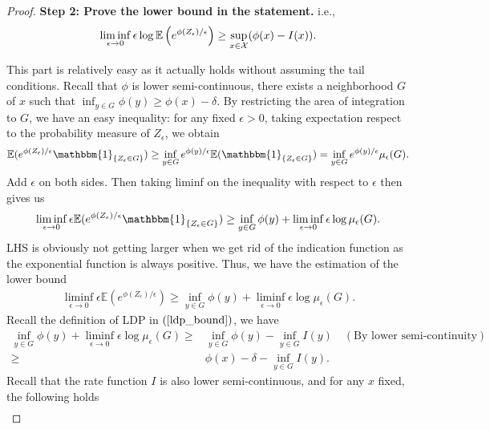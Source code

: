 \documentclass[10pt]{article}
\def\X{{\cal X}}
\newcommand{\e}{\mathbb{E}}
\newenvironment{Proof of lemma}{\noindent{\bf Proof of Lemma}}{\hfill$\Box$\newline}
\newenvironment{Proof of claim}{\noindent{\bf Proof of claim}}{\hfill$\Box$\newline}
\newenvironment{Proof of theorem}{\noindent{\bf Proof of Theorem}}{\hfill\scriptsize{$\Box$}\newline}
\newenvironment{Proof of theorems}{\noindent{\bf Proof of Theorems}}{\hfill$\Box$\newline}
\newenvironment{Proof of proposition}{\noindent{\bf Proof of Proposition}}{\hfill$\Box$\newline}
\newenvironment{Proof of propositions}{\noindent{\bf Proof of Propositions}}{\hfill$\Box$\newline}
\newenvironment{Proof of exercise}{\noindent{\it Proof of Exercise:}}{\hfill$\Box$}
\numberwithin{equation}{section}
\begin{document}
\begin{proof}
    \textbf{Step 2: Prove the lower bound in the statement.} i.e.,
    \begin{align}
        \liminf_{\epsilon \to 0} \epsilon \log \e \left(e^{\phi(Z_{\epsilon})/\epsilon}\right) \geq \sup_{x \in \X}(\phi(x)-I(x)).
    \end{align}

    This part is relatively easy as it actually holds without assuming the tail conditions. Recall that $\phi$ is lower semi-continuous, there exists a neighborhood $G$ of $x$ such that $\inf_{y \in G} \phi(y) \geq \phi(x) - \delta$. By restricting the area of integration to $G$, we have an easy inequality: for any fixed $\epsilon > 0$, taking expectation respect to the probability measure of $Z_{\epsilon}$, we obtain
    \begin{align}
        \e(e^{\phi(Z_{\epsilon})/\epsilon}\mathbbm{1}_{\{Z_{\epsilon}\in G\}}) \geq \inf_{y \in G}e^{\phi(y)/\epsilon}\e (\mathbbm{1}_{\{Z_{\epsilon}\in G\}}) = \inf_{y \in G}e^{\phi(y)/\epsilon} \mu_{\epsilon}(G).
    \end{align}
    Add $\epsilon$ on both sides. Then taking liminf on the inequality with respect to $\epsilon$ then gives us
    \begin{align}
        \liminf_{\epsilon \to 0} \epsilon \e(e^{\phi(Z_{\epsilon})/\epsilon}\mathbbm{1}_{\{Z_{\epsilon}\in G\}}) \geq \inf_{y \in G} \phi(y) + \liminf_{\epsilon \to 0} \epsilon \log \mu_{\epsilon}(G).
    \end{align}
    LHS is obviously not getting larger when we get rid of the indication function as the exponential function is always positive. Thus, we have the estimation of the lower bound
    \begin{align}
        \liminf_{\epsilon \to 0} \epsilon \e(e^{\phi(Z_{\epsilon})/\epsilon}) \geq \inf_{y \in G} \phi(y) + \liminf_{\epsilon \to 0} \epsilon \log \mu_{\epsilon}(G).
    \end{align}
    Recall the definition of LDP in $(\ref{ldp_bound})$, we have
    \begin{align} \label{ldp_lower_last_step}
        \inf_{y \in G} \phi(y) + \liminf_{\epsilon \to 0} \epsilon \log \mu_{\epsilon}(G) \geq&  \inf_{y \in G} \phi(y) - \inf_{y \in G} I(y) \quad(\text{By lower semi-continuity}) \nonumber \\
        \geq& \phi(x) -\delta - \inf_{y \in G} I(y).
    \end{align}
    Recall that the rate function $I$ is also lower semi-continuous, and for any $x$ fixed, the following holds
    \begin{align}

\end{align}
\end{proof}
\end{document}
